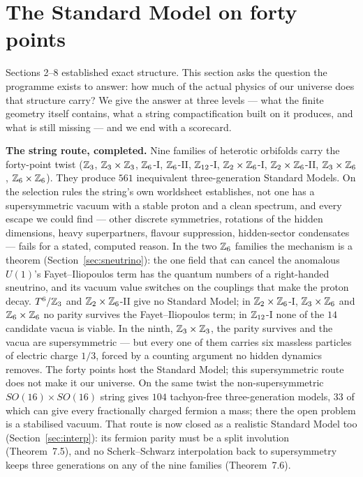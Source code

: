 \section{The Standard Model on forty points}
\label{sec:physics}

Sections 2--8 established exact structure. This section asks the question the programme
exists to answer: how much of the actual physics of our universe does that structure
carry? We give the answer at three levels --- what the finite geometry itself contains,
what a string compactification built on it produces, and what is still missing --- and we
end with a scorecard.

\begin{keyidea}
\textbf{The string route, completed.} Nine families of heterotic orbifolds carry the forty-point twist
($\mathbb{Z}_3$, $\mathbb{Z}_3\times\mathbb{Z}_3$, $\mathbb{Z}_6$-I, $\mathbb{Z}_6$-II, $\mathbb{Z}_{12}$-I, $\mathbb{Z}_2\times\mathbb{Z}_6$-I, $\mathbb{Z}_2\times\mathbb{Z}_6$-II, $\mathbb{Z}_3\times\mathbb{Z}_6$,
$\mathbb{Z}_6\times\mathbb{Z}_6$). They produce $561$ inequivalent three-generation Standard Models. On the selection rules the string's
own worldsheet establishes, not one has a supersymmetric vacuum with a stable proton and a clean spectrum, and
every escape we could find --- other discrete symmetries, rotations of the hidden dimensions, heavy
superpartners, flavour suppression, hidden-sector condensates --- fails for a stated, computed reason. In the two
$\mathbb{Z}_6$ families the mechanism is a theorem (Section~\ref{sec:sneutrino}): the one field that can cancel the anomalous $U(1)$'s Fayet--Iliopoulos term has
the quantum numbers of a right-handed sneutrino, and its vacuum value switches on the couplings that make the
proton decay. $T^6/\mathbb{Z}_3$ and $\mathbb{Z}_2\times\mathbb{Z}_6$-II give no Standard Model; in $\mathbb{Z}_2\times\mathbb{Z}_6$-I, $\mathbb{Z}_3\times\mathbb{Z}_6$
and $\mathbb{Z}_6\times\mathbb{Z}_6$ no parity survives the Fayet--Iliopoulos term; in $\mathbb{Z}_{12}$-I none of the $14$ candidate vacua is
viable. In the ninth, $\mathbb{Z}_3\times\mathbb{Z}_3$, the parity survives and the vacua are supersymmetric --- but every one
of them carries six massless particles of electric charge $1/3$, forced by a counting argument no hidden dynamics
removes. The forty points host the Standard Model; this supersymmetric route does not make it our universe. On the same twist the non-supersymmetric
$SO(16)\times SO(16)$ string gives $104$ tachyon-free three-generation models, $33$ of which can give every
fractionally charged fermion a mass; there the open problem is a stabilised vacuum. That route is now closed as a
realistic Standard Model too (Section~\ref{sec:interp}): its fermion parity must be a split involution (Theorem~7.5), and no
Scherk--Schwarz interpolation back to supersymmetry keeps three generations on any of the nine families (Theorem~7.6).
\end{keyidea}


